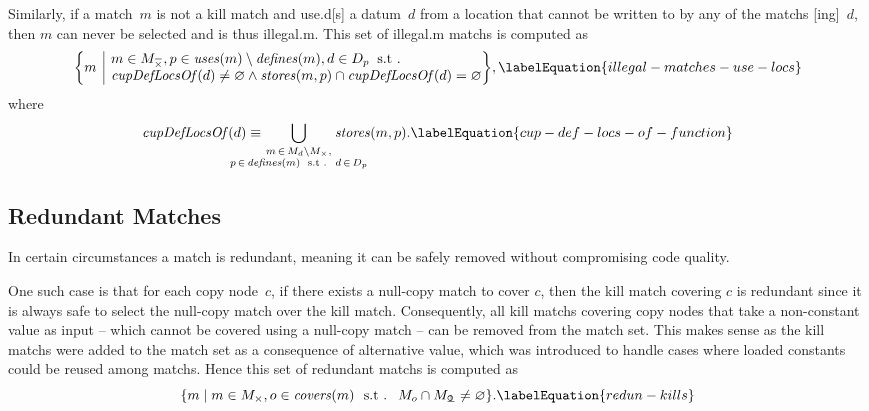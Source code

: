 Similarly, if a \gls{match}~$m$ is not a \gls{kill match} and \gls{use.d}[s] a
\gls{datum}~$d$ from a \gls{location} that cannot be written to by any of the
\glspl{match} [ing]~$d$, then $m$ can never be selected and
is thus \gls{illegal.m}.
%
This set of \gls{illegal.m} \glspl{match} is computed as
%
\begin{equation}
  \mSetBuilder*{m}%
               {%
                 \begin{array}{@{}l@{}}
                   m \in \mKillMatchCompSet,
                   p \in \mUses(m) \setminus \mDefines(m),
                   d \in \mDataSet[p] \hspace{-1pt} \text{ \st} \\
                   \mCupDefLocsOf(d) \neq \mEmptySet
                   \mAnd
                   \mStores(m, p) \cap \mCupDefLocsOf(d) = \mEmptySet
                 \end{array}
               } \!,
  \labelEquation{illegal-matches-use-locs}
\end{equation}
%
where
%
\begin{equation}
  \mCupDefLocsOf(d)
  \equiv
  \hspace{-2.5em}
  \bigcup_{\substack{%
                   m \, \in \, \mMatchSet[d] \setminus \mKillMatchSet, \\
                   p \, \in \, \mDefines(m)
                   \text{ \st } d \, \in \, \mDataSet[p]
                  }}
    \hspace{-2.5em}
    \mStores(m, p).
  \labelEquation{cup-def-locs-of-function}
\end{equation}


\subsection{Redundant Matches}

In certain circumstances a \gls{match} is redundant, meaning it can be
safely removed without compromising code quality.

One such case is that for each \gls{copy node}~$c$, if there exists a
\gls{null-copy match} to cover $c$, then the \gls{kill match} covering $c$ is
redundant since it is always safe to select the \gls{null-copy match} over the
\gls{kill match}.
%
Consequently, all \glspl{kill match} covering \glspl{copy node} that take a
non-constant value as input -- which cannot be covered using a \gls{null-copy
  match} -- can be removed from the \gls{match set}.
%
This makes sense as the \glspl{kill match} were added to the \gls{match set} as
a consequence of \gls{alternative value}, which was introduced to handle cases
where loaded constants could be reused among \glspl{match}.
%
Hence this set of redundant \glspl{match} is computed as
%
\begin{equation}
  \mSetBuilder{m}%
              {%
                m \in \mKillMatchSet,
                o \in \mCovers(m)
                \text{ \st }
                \mMatchSet[o] \cap \mNullCopyMatchSet \neq \mEmptySet
              }.
  \labelEquation{redun-kills}
\end{equation}

